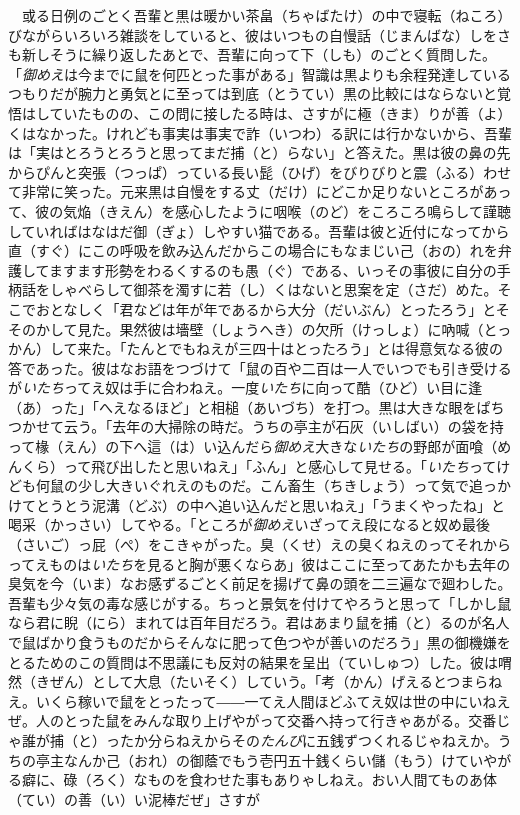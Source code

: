 \documentclass{book}
\begin{document}
　或る日例のごとく吾輩と黒は暖かい茶畠（ちゃばたけ）の中で寝転（ねころ）びながらいろいろ雑談をしていると、彼はいつもの自慢話（じまんばな）しをさも新しそうに繰り返したあとで、吾輩に向って下（しも）のごとく質問した。「\emph{御めえ}は今までに鼠を何匹とった事がある」智識は黒よりも余程発達しているつもりだが腕力と勇気とに至っては到底（とうてい）黒の比較にはならないと覚悟はしていたものの、この問に接したる時は、さすがに極（きま）りが善（よ）くはなかった。けれども事実は事実で詐（いつわ）る訳には行かないから、吾輩は「実はとろうとろうと思ってまだ捕（と）らない」と答えた。黒は彼の鼻の先からぴんと突張（つっぱ）っている長い髭（ひげ）をびりびりと震（ふる）わせて非常に笑った。元来黒は自慢をする丈（だけ）にどこか足りないところがあって、彼の気焔（きえん）を感心したように咽喉（のど）をころころ鳴らして謹聴していればはなはだ御（ぎょ）しやすい猫である。吾輩は彼と近付になってから直（すぐ）にこの呼吸を飲み込んだからこの場合にもなまじい己（おの）れを弁護してますます形勢をわるくするのも愚（ぐ）である、いっその事彼に自分の手柄話をしゃべらして御茶を濁すに若（し）くはないと思案を定（さだ）めた。そこでおとなしく「君などは年が年であるから大分（だいぶん）とったろう」とそそのかして見た。果然彼は墻壁（しょうへき）の欠所（けっしょ）に吶喊（とっかん）して来た。「たんとでもねえが三四十はとったろう」とは得意気なる彼の答であった。彼はなお語をつづけて「鼠の百や二百は一人でいつでも引き受けるが\emph{いたち}ってえ奴は手に合わねえ。一度\emph{いたち}に向って酷（ひど）い目に逢（あ）った」「へえなるほど」と相槌（あいづち）を打つ。黒は大きな眼をぱちつかせて云う。「去年の大掃除の時だ。うちの亭主が石灰（いしばい）の袋を持って椽（えん）の下へ這（は）い込んだら\emph{御めえ}大きな\emph{いたち}の野郎が面喰（めんくら）って飛び出したと思いねえ」「ふん」と感心して見せる。「\emph{いたち}ってけども何鼠の少し大きいぐれえのものだ。こん畜生（ちきしょう）って気で追っかけてとうとう泥溝（どぶ）の中へ追い込んだと思いねえ」「うまくやったね」と喝采（かっさい）してやる。「ところが\emph{御めえ}いざってえ段になると奴め最後（さいご）っ屁（ぺ）をこきゃがった。臭（くせ）えの臭くねえのってそれからってえものは\emph{いたち}を見ると胸が悪くならあ」彼はここに至ってあたかも去年の臭気を今（いま）なお感ずるごとく前足を揚げて鼻の頭を二三遍なで廻わした。吾輩も少々気の毒な感じがする。ちっと景気を付けてやろうと思って「しかし鼠なら君に睨（にら）まれては百年目だろう。君はあまり鼠を捕（と）るのが名人で鼠ばかり食うものだからそんなに肥って色つやが善いのだろう」黒の御機嫌をとるためのこの質問は不思議にも反対の結果を呈出（ていしゅつ）した。彼は喟然（きぜん）として大息（たいそく）していう。「考（かん）げえるとつまらねえ。いくら稼いで鼠をとったって――一てえ人間ほどふてえ奴は世の中にいねえぜ。人のとった鼠をみんな取り上げやがって交番へ持って行きゃあがる。交番じゃ誰が捕（と）ったか分らねえからその\emph{たんび}に五銭ずつくれるじゃねえか。うちの亭主なんか己（おれ）の御蔭でもう壱円五十銭くらい儲（もう）けていやがる癖に、碌（ろく）なものを食わせた事もありゃしねえ。おい人間てものあ体（てい）の善（い）い泥棒だぜ」さすが
\end{document}
